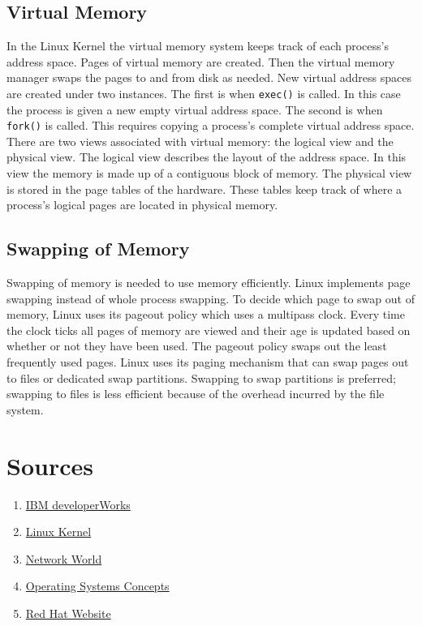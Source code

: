 \documentclass[12pt]{article}
\begin{document}
\subsection{Virtual Memory}
In the Linux Kernel the virtual memory system keeps track of each process's address space. Pages of virtual memory are created. Then the virtual memory manager swaps the pages to and from disk as needed. New virtual address spaces are created under two instances. The first is when \lstinline|exec()| is called. In this case the process is given a new empty virtual address space. The second is when \lstinline|fork()| is called. This requires copying a process's complete virtual address space. There are two views associated with virtual memory: the logical view and the physical view. The logical view describes the layout of the address space. In this view the memory is made up of a contiguous block of memory. The physical view is stored in the page tables of the hardware. These tables keep track of where a process's logical pages are located in physical memory.

\subsection{Swapping of Memory}
Swapping of memory is needed to use memory efficiently. Linux implements page swapping instead of whole process swapping. To decide which page to swap out of memory, Linux uses its pageout policy which uses a multipass clock. Every time the clock ticks all pages of memory are viewed and their age is updated based on whether or not they have been used. The pageout policy swaps out the least frequently used pages. Linux uses its paging mechanism that can swap pages out to files or dedicated swap partitions. Swapping to swap partitions is preferred; swapping to files is less efficient because of the overhead incurred by the file system.

\pagebreak
\section*{Sources}
\singlespacing
\begin{enumerate}
\item\href{https://www.ibm.com/developerworks/learn/}{IBM developerWorks}
\item\href{https://github.com/torvalds/linux}{Linux Kernel}
\item\href{https://www.networkworld.com/article/2597777/software/162275-10-things-you-need-to-know-about-Red-Hat-Enterprise-Linux-7.html}{Network World}
\item\href{https://www.amazon.com/Operating-System-Concepts-Abraham-Silberschatz/dp/1118129385}{Operating Systems Concepts}
\item\href{https://access.redhat.com/}{Red Hat Website}
\end{enumerate}
\end{document}
